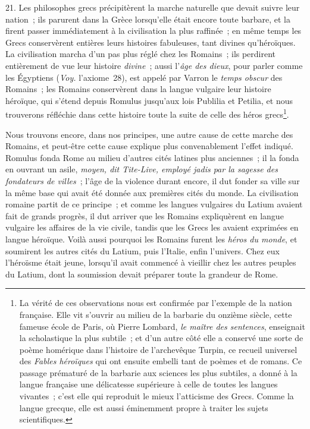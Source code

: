 \documentclass[french,twoside]{book} %
\begin{document}
21. Les philosophes grecs précipitèrent la marche naturelle que devait suivre leur nation ; ils parurent dans la Grèce lorsqu’elle était encore toute barbare, et la firent passer immédiatement à la civilisation la plus raffinée ; en même temps les Grecs conservèrent entières leurs histoires fabuleuses, tant divines qu’héroïques. La civilisation marcha d’un pas plus réglé chez les Romains ; ils perdirent entièrement de vue leur histoire {\itshape divine} ; aussi l’{\itshape âge des dieux}, pour parler comme les Égyptiens ({\itshape Voy.} l’axiome 28), est appelé par Varron le {\itshape temps obscur} des Romains ; les Romains conservèrent dans la langue vulgaire leur histoire héroïque, qui s’étend depuis Romulus jusqu’aux lois Publilia et Petilia, et nous trouverons réfléchie dans cette histoire toute la suite de celle des héros grecs\footnote{La vérité de ces observations nous est confirmée par l’exemple de la nation française. Elle vit s’ouvrir au milieu de la barbarie du onzième siècle, cette fameuse école de Paris, où Pierre Lombard, {\itshape le maître des sentences}, enseignait la scholastique la plus subtile ; et d’un autre côté elle a conservé une sorte de poème homérique dans l’histoire de l’archevêque Turpin, ce recueil universel des {\itshape Fables héroïques} qui ont ensuite embelli tant de poèmes et de romans. Ce passage prématuré de la barbarie aux sciences les plus subtiles, a donné à la langue française une délicatesse supérieure à celle de toutes les langues vivantes ; c’est elle qui reproduit le mieux l’atticisme des Grecs. Comme la langue grecque, elle est aussi éminemment propre à traiter les sujets scientifiques.}.\par
 Nous trouvons encore, dans nos principes, une autre cause de cette marche des Romains, et peut-être cette cause explique plus convenablement l’effet indiqué. Romulus fonda Rome au milieu d’autres cités latines plus anciennes ; il la fonda en ouvrant un asile, \emph{{\itshape moyen}, dit Tite-Live, {\itshape  employé jadis par la sagesse des fondateurs de villes}} ; l’âge de la violence durant encore, il dut fonder sa ville sur la même base qui avait été donnée aux premières cités du monde. La civilisation romaine partit de ce principe ; et comme les langues vulgaires du Latium avaient fait de grands progrès, il dut arriver que les Romains expliquèrent en langue vulgaire les affaires de la vie civile, tandis que les Grecs les avaient exprimées en langue héroïque. Voilà aussi pourquoi les Romains furent les {\itshape héros du monde}, et soumirent les autres cités du Latium, puis l’Italie, enfin l’univers. Chez eux l’héroïsme était jeune, lorsqu’il avait commencé à vieillir chez les autres peuples du Latium, dont la soumission devait préparer toute la grandeur de Rome.\par
\end{document}
